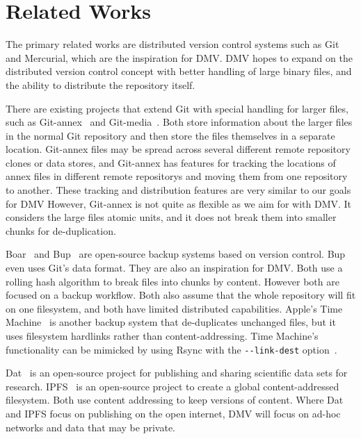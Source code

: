 \section{Related Works}

The primary related works are distributed version control systems such as Git and Mercurial, which are the inspiration for DMV.
DMV hopes to expand on the distributed version control concept with better handling of large binary files, and the ability to distribute the repository itself.

There are existing projects that extend Git with special handling for larger files, such as Git-annex~\cite{git_annex_homepage} and Git-media~\cite{git_media_github}.
Both store information about the larger files in the normal Git \gls{repository} and then store the files themselves in a separate location.
Git-annex files may be spread across several different remote \gls{repository} clones or data stores, and Git-annex has features for tracking the locations of annex files in different remote \glspl{repository} and moving them from one \gls{repository} to another.
These tracking and distribution features are very similar to our goals for DMV
However, Git-annex is not quite as flexible as we aim for with \gls{DMV}.
It considers the large files atomic units, and it does not break them into smaller chunks for de-duplication.

Boar~\cite{boar_homepage} and Bup~\cite{bup_homepage} are open-source backup systems based on version control.
Bup even uses Git's data format.
They are also an inspiration for DMV.
Both use a rolling hash algorithm to break files into chunks by content.
However both are focused on a backup workflow.
Both also assume that the whole repository will fit on one filesystem, and both have limited distributed capabilities.
Apple's Time Machine~\cite{timemachine_patent} is another backup system that de-duplicates unchanged files, but it uses filesystem hardlinks rather than content-addressing.
Time Machine's functionality can be mimicked by using Rsync with the \lstinline{--link-dest} option~\cite{timemachine_foreveryunix}.

Dat~\cite{dat_homepage} is an open-source project for publishing and sharing scientific data sets for research.
IPFS~\cite{ipfs_github_main} is an open-source pro\-ject to create a global content-addressed filesystem.
Both use content addressing to keep versions of content.
Where Dat and IPFS focus on publishing on the open internet, DMV will focus on ad-hoc networks and data that may be private.


